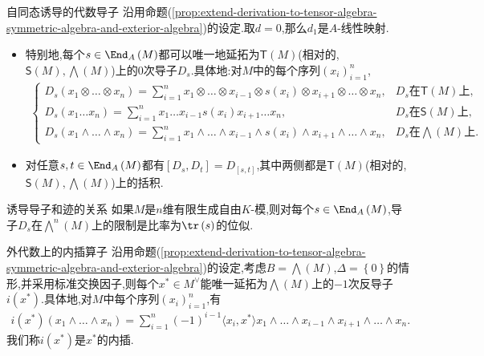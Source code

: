 \begin{example}{自同态诱导的代数导子}{}
	沿用命题(\cref{prop:extend-derivation-to-tensor-algebra-symmetric-algebra-and-exterior-algebra})的设定.取$d=0$,那么$d_{1}$是$A$-线性映射.
	\begin{itemize}
		\item 特别地,每个$s\in\End_{A}\left(M\right)$都可以唯一地延拓为$\mathsf{T}\left(M\right)$(相对的,$\mathsf{S}\left(M\right),\bigwedge\left(M\right)$)上的$0$次导子$D_{s}$.具体地:对$M$中的每个序列$\left(x_{i}\right)_{i=1}^{n}$,
		\begin{align*}
			\begin{cases}
				D_{s}\left(x_{1}\otimes\ldots\otimes x_{n}\right)=\sum\limits_{i=1}^{n}x_{1}\otimes\ldots\otimes x_{i-1}\otimes s\left(x_{i}\right)\otimes x_{i+1}\otimes\ldots\otimes x_{n},&D_{s}\text{在}\mathsf{T}\left(M\right)\text{上},\\
				D_{s}\left(x_{1}\ldots x_{n}\right)=\sum\limits_{i=1}^{n}x_{1}\ldots x_{i-1}s\left(x_{i}\right)x_{i+1}\ldots x_{n},&D_{s}\text{在}\mathsf{S}\left(M\right)\text{上},\\
				D_{s}\left(x_{1}\wedge\ldots\wedge x_{n}\right)=\sum\limits_{i=1}^{n}x_{1}\wedge\ldots\wedge x_{i-1}\wedge s\left(x_{i}\right)\wedge x_{i+1}\wedge\ldots\wedge x_{n},&D_{s}\text{在}\bigwedge\left(M\right)\text{上}.
			\end{cases}
		\end{align*}
		\item 对任意$s,t\in\End_{A}\left(M\right)$都有$\left[D_{s},D_{t}\right]=D_{\left[s,t\right]}$,其中两侧都是$\mathsf{T}\left(M\right)$(相对的,$\mathsf{S}\left(M\right),\bigwedge\left(M\right)$)上的括积.
	\end{itemize}
\end{example}

\begin{proposition}{诱导导子和迹的关系}{}
	如果$M$是$n$维有限生成自由$K$-模,则对每个$s\in\End_{A}\left(M\right)$,导子$D_{s}$在$\bigwedge\limits^{n}\left(M\right)$上的限制是比率为$\tr\left(s\right)$的位似.
\end{proposition}

\begin{example}{外代数上的内插算子}{}
	沿用命题(\cref{prop:extend-derivation-to-tensor-algebra-symmetric-algebra-and-exterior-algebra})的设定,考虑$B=\bigwedge\left(M\right)$,$\Delta=\left\{0\right\}$的情形,并采用标准交换因子,则每个$x^{\ast}\in M^{\vee}$能唯一延拓为$\bigwedge\left(M\right)$上的$-1$次反导子$i\left(x^{\ast}\right)$.具体地,对$M$中每个序列$\left(x_{i}\right)_{i=1}^{n}$,有
	\begin{align*}
		i\left(x^{\ast}\right)\left(x_{1}\wedge\ldots\wedge x_{n}\right)=\sum\limits_{i=1}^{n}\left(-1\right)^{i-1}\langle x_{i},x^{\ast}\rangle x_{1}\wedge\ldots\wedge x_{i-1}\wedge x_{i+1}\wedge\ldots\wedge x_{n}.
	\end{align*}
	我们称$i\left(x^{\ast}\right)$是$x^{\ast}$的内插.
\end{example}


